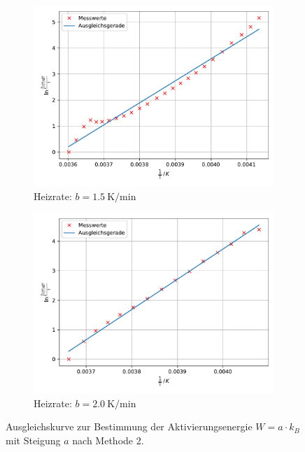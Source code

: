 \begin{figure}
    \begin{subfigure}{0.48\textwidth}
        \centering
        \includegraphics[height=0.8\textwidth]{content/data/integration_15.pdf}
        \caption{Heizrate: $b = \SI{1.5}{\kelvin \per \minute}$}
        \label{subfig:int_15}
    \end{subfigure}
    \hfill
    \begin{subfigure}{0.48\textwidth}
        \centering
        \includegraphics[height=0.8\textwidth]{content/data/integration_20.pdf}
        \caption{Heizrate: $b = \SI{2.0}{\kelvin \per \minute}$}
        \label{subfig:int_20}
    \end{subfigure}
    \caption{Ausgleichskurve zur Bestimmung der Aktivierungsenergie $W = a \cdot k_B$ mit Steigung $a$ nach Methode 2.\cite{matplotlib}\cite{scipy}\cite{numpy}}
    \label{fig:int}
\end{figure}
\FloatBarrier

